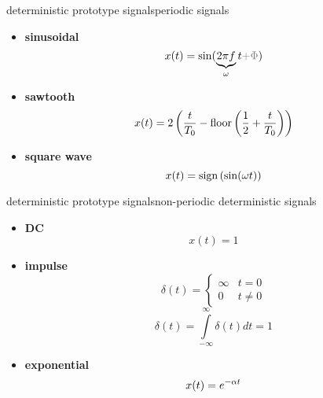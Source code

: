 \begin{frame}{deterministic prototype signals}{periodic signals}
            \begin{itemize}
                \item   \textbf{sinusoidal}
                    \[x(t) = \sin(\underbrace{2\pi f}_{\omega} t {\color{gray}{+ \Phi}})\]
                \smallskip
                \item<2->   \textbf{sawtooth}
                    \begin{equation*}
                        x(t) = 2\left(\frac{t}{T_0}-\operatorname*{floor}\left(\frac{1}{2}+\frac{t}{T_0}\right)\right)
                    \end{equation*}
                \smallskip
                \item<3->   \textbf{square wave}
                    \[x(t) = \operatorname*{sign}\left(\sin(\omega t)\right)\]
            \end{itemize}
\end{frame}
\begin{frame}{deterministic prototype signals}{non-periodic deterministic signals}
    \begin{itemize}
        \item   \textbf{DC}
            \[ x(t) = 1\]
        \smallskip
        \item<2->   \textbf{impulse}
            \begin{equation*}
                \delta(t) = 
                    \begin{cases}
                            \infty & t = 0 \\
                            0   & t \neq 0
                    \end{cases}
            \end{equation*}
            \begin{equation*}
                \delta(t) = \int\limits_{-\infty}^{\infty}{\delta(t) dt = 1}
            \end{equation*}
        \smallskip
        \item<3->   \textbf{exponential}
            \[ x(t) = {e}^{-\alpha t}\]
    \end{itemize}
\end{frame}
